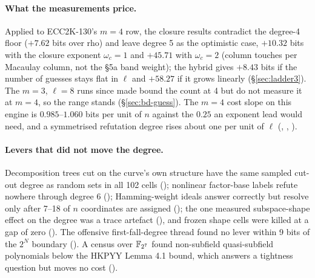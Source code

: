 \paragraph{What the measurements price.} Applied to ECC2K-130's $m=4$ row,
the closure results contradict the degree-4 floor ($+7.62$ bits over rho)
and leave degree 5 as the optimistic case, $+10.32$ bits with the closure
exponent $\omega_c=1$ and $+45.71$ with $\omega_c=2$ (column touches per
Macaulay column, not the \S5a band weight); the hybrid gives $+8.43$ bits if
the number of guesses stays flat in $\ell$ and $+58.27$ if it grows
linearly (\S\ref{sec:ladder3}). The $m=3$, $\ell=8$ runs since made bound the
count at 4 but do not measure it at $m=4$, so the range stands
(\S\ref{sec:bd-guess}). The $m=4$ cost slope on this
engine is $0.985$--$1.060$ bits per unit of $n$ against the $0.25$ an exponent
lead would need, and a symmetrised refutation degree rises about one per
unit of $\ell$ (,
,
).

\paragraph{Levers that did not move the degree.} Decomposition trees cut
on the curve's own structure have the same sampled cut-out degree as random
sets in all 102 cells ();
nonlinear factor-base labels refute nowhere through degree 6
(); Hamming-weight ideals
answer correctly but resolve only after 7--18 of $n$ coordinates are
assigned (); the one measured
subspace-shape effect on the degree was a trace artefact
(),
and frozen shape cells were killed at a gap of zero
(). The offensive first-fall-degree
thread found no lever within 9 bits of the $2^N$ boundary
(). A census
over $\mathbb{F}_{2^7}$ found non-subfield quasi-subfield polynomials below the
HKPYY Lemma 4.1 bound, which answers a tightness question but moves no
cost ().


